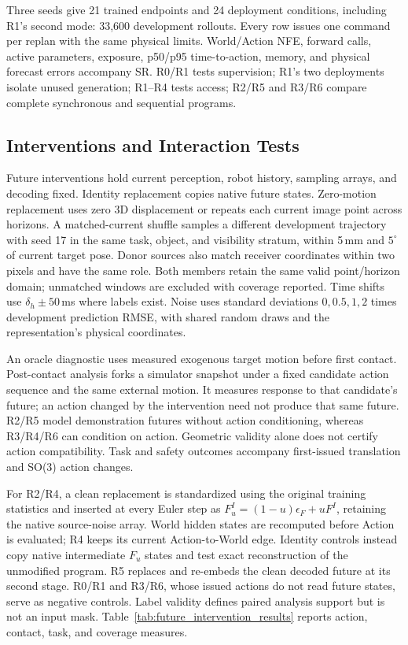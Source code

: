 Three seeds give 21 trained endpoints and 24 deployment conditions, including
R1's second mode: 33,600 development rollouts. Every row issues one command
per replan with the same physical limits. World/Action NFE, forward calls,
active parameters, exposure, p50/p95 time-to-action, memory, and physical
forecast errors accompany SR. R0/R1 tests supervision; R1's two deployments
isolate unused generation; R1--R4 tests access; R2/R5 and R3/R6 compare
complete synchronous and sequential programs.



\subsection{Interventions and Interaction Tests}
\label{app:design_crosschecks}
Future interventions hold current perception, robot history, sampling arrays,
and decoding fixed. Identity replacement copies native future states.
Zero-motion replacement uses zero 3D displacement or repeats each current
image point across horizons. A matched-current shuffle samples a different
development trajectory with seed 17 in the same task,
object, and visibility stratum, within 5\,mm and $5^\circ$ of current target
pose. Donor sources also match receiver coordinates within two pixels and
have the same role. Both members retain the same valid point/horizon
domain; unmatched windows are excluded with coverage reported. Time shifts use
$\delta_h\pm50$\,ms where labels exist. Noise uses standard deviations
$0,0.5,1,2$ times development prediction RMSE, with shared random draws and
the representation's physical coordinates.

An oracle diagnostic uses measured exogenous target motion before first
contact. Post-contact analysis forks a simulator snapshot under a fixed
candidate action sequence and the same external motion. It measures response
to that candidate's future; an action changed by the intervention need not
produce that same future. R2/R5 model demonstration futures without action
conditioning, whereas R3/R4/R6 can condition on action. Geometric validity
alone does not certify action compatibility. Task and safety outcomes
accompany first-issued translation and SO(3) action changes.

For R2/R4, a clean replacement is standardized using the original training
statistics and inserted at every Euler step as
$F_u^{I}=(1-u)\epsilon_F+uF^{I}$, retaining the native source-noise array.
World hidden states are recomputed before Action is evaluated; R4 keeps
its current Action-to-World edge. Identity controls instead copy native
intermediate $F_u$ states and test exact reconstruction of the unmodified
program. R5 replaces and re-embeds the clean decoded future at its second
stage. R0/R1 and R3/R6, whose issued actions do not read future states,
serve as negative controls. Label validity defines paired analysis support
but is not an input mask. Table~\ref{tab:future_intervention_results}
reports action, contact, task, and coverage measures.

